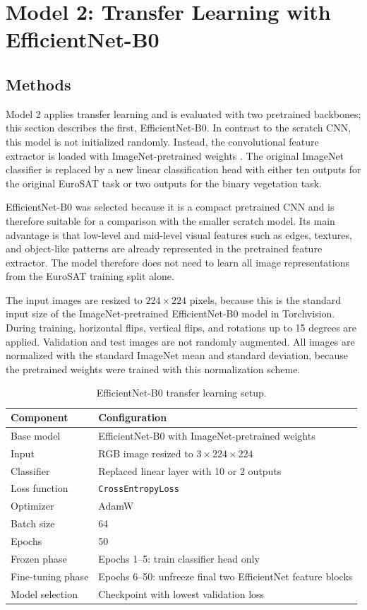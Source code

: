 \section{Model 2: Transfer Learning with EfficientNet-B0}

\subsection{Methods}

Model 2 applies transfer learning and is evaluated with two pretrained backbones;
this section describes the first, EfficientNet-B0. In contrast to
the scratch CNN, this model is not initialized randomly. Instead, the
convolutional feature extractor is loaded with ImageNet-pretrained weights
\cite{tan2019efficientnet}. The original ImageNet classifier is replaced by a
new linear classification head with either ten outputs for the original
EuroSAT task or two outputs for the binary vegetation task.

EfficientNet-B0 was selected because it is a compact pretrained CNN and is
therefore suitable for a comparison with the smaller scratch model. Its main
advantage is that low-level and mid-level visual features such as edges,
textures, and object-like patterns are already represented in the pretrained
feature extractor. The model therefore does not need to learn all image
representations from the EuroSAT training split alone.

The input images are resized to $224 \times 224$ pixels, because this is the
standard input size of the ImageNet-pretrained EfficientNet-B0 model in
Torchvision. During training, horizontal flips, vertical flips, and rotations up
to 15 degrees are applied. Validation and test images are not randomly
augmented. All images are normalized with the standard ImageNet mean and
standard deviation, because the pretrained weights were trained with this
normalization scheme.

\begin{table}[H]
\centering
\caption{EfficientNet-B0 transfer learning setup.}
\label{tab:efficientnet_setup}
\small
\begin{tabularx}{\textwidth}{lX}
\toprule
Component & Configuration \\
\midrule
Base model & EfficientNet-B0 with ImageNet-pretrained weights \\
Input & RGB image resized to $3 \times 224 \times 224$ \\
Classifier & Replaced linear layer with 10 or 2 outputs \\
Loss function & \texttt{CrossEntropyLoss} \\
Optimizer & AdamW \\
Batch size & 64 \\
Epochs & 50 \\
Frozen phase & Epochs 1--5: train classifier head only \\
Fine-tuning phase & Epochs 6--50: unfreeze final two EfficientNet feature blocks \\
Model selection & Checkpoint with lowest validation loss \\
\bottomrule
\end{tabularx}
\end{table}

